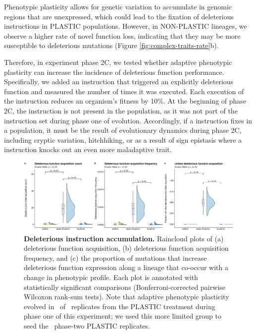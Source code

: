 \begin{raggedbottom}
Phenotypic plasticity allows for genetic variation to accumulate in genomic regions that are unexpressed, which could lead to the fixation of deleterious instructions in PLASTIC populations.
However, in NON-PLASTIC lineages, we observe a higher rate of novel function loss, indicating that they may be more susceptible to deleterious mutations (Figure \ref{fig:complex-traits-rate}b).

Therefore, in experiment phase 2C, we tested whether adaptive phenotypic plasticity can increase the incidence of deleterious function performance.
Specifically, we added an instruction that triggered an explicitly deleterious  function and measured the number of times it was executed.
Each execution of the  instruction reduces an organism's fitness by 10\%.
At the beginning of phase 2C, the  instruction is not present in the population, as it was not part of the instruction set during phase one of evolution.
Accordingly, if a  instruction fixes in a population, it must be the result of evolutionary dynamics during phase 2C, including cryptic variation, hitchhiking, or as a result of sign epistasis where a  instruction knocks out an even more maladaptive trait.

\begin{figure}[ht!]
  \centering
  \includegraphics[width=1.0\textwidth]{05_consequences_of_plasticity/media/media-poison-accumulation-panel.pdf}
  \caption{\small
  \textbf{Deleterious instruction accumulation.}
  Raincloud plots of
  (a) deleterious function acquisition,
  (b) deleterious function acquisition frequency,
  and (c) the proportion of mutations that increase deleterious function expression along a lineage that co-occur with a change in phenotypic profile.
  Each plot is annotated with statistically significant comparisons (Bonferroni-corrected pairwise Wilcoxon rank-sum tests).
  Note that adaptive phenotypic plasticity evolved in \deleteriousHitchhikingPlasticReps\ of \deleteriousHitchhikingReplicates\ replicates from the PLASTIC treatment during phase one of this experiment; we used this more limited group to seed the \deleteriousHitchhikingPlasticReps\ phase-two PLASTIC replicates.
  }
  \label{fig:deleterious-hitchhiking}
\end{figure}


\end{raggedbottom}
